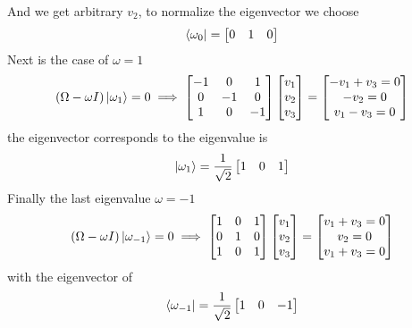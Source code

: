 \documentclass[../main.tex]{subfiles}
\begin{document}
And we get arbitrary $v_2$, to normalize the eigenvector we choose
\begin{equation*}
    \bra{\omega_0}=
    \begin{bmatrix}
        0&1&0\\
    \end{bmatrix}
\end{equation*}
Next is the case of $\omega=1$
\begin{equation*}
    (\Omega-\omega I)\ket{\omega_1}=0\implies
    \begin{bmatrix}
        -1&0&1\\
        0&-1&0\\
        1&0&-1\\
    \end{bmatrix}
    \begin{bmatrix}
        v_1\\
        v_2\\
        v_3\\
    \end{bmatrix}
    =
    \begin{bmatrix}
        -v_1+v_3=0\\
        -v_2=0\\
        v_1-v_3=0
    \end{bmatrix}
\end{equation*}
the eigenvector corresponds to the eigenvalue is 
\begin{equation*}
    \ket{\omega_1}=\frac{1}{\sqrt{2}}
    \begin{bmatrix}
        1&0&1
    \end{bmatrix}
\end{equation*}
Finally the last eigenvalue $\omega=-1$
\begin{equation*}
    (\Omega-\omega I)\ket{\omega_{-1}}=0\implies
    \begin{bmatrix}
        1&0&1\\
        0&1&0\\
        1&0&1\\
    \end{bmatrix}
    \begin{bmatrix}
        v_1\\
        v_2\\
        v_3\\
    \end{bmatrix}
    =
    \begin{bmatrix}
        v_1+v_3=0\\
        v_2=0\\
        v_1+v_3=0
    \end{bmatrix}
\end{equation*}
with the eigenvector of 
\begin{equation*}
    \bra{\omega_{-1}}=\frac{1}{\sqrt{2}}
    \begin{bmatrix}
        1&0&-1
    \end{bmatrix}
\end{equation*}
\end{document}
